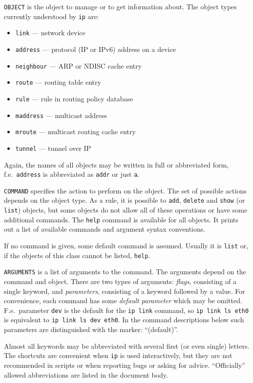 \verb|OBJECT| is the object to manage or to get information about.
The object types currently understood by \verb|ip| are:

\begin{itemize}
\item \verb|link| --- network device
\item \verb|address| --- protocol (IP or IPv6) address on a device
\item \verb|neighbour| --- ARP or NDISC cache entry
\item \verb|route| --- routing table entry
\item \verb|rule| --- rule in routing policy database
\item \verb|maddress| --- multicast address
\item \verb|mroute| --- multicast routing cache entry
\item \verb|tunnel| --- tunnel over IP
\end{itemize}

Again, the names of all objects may be written in full or
abbreviated form, f.e.\ \verb|address| is abbreviated as \verb|addr|
or just \verb|a|.

\verb|COMMAND| specifies the action to perform on the object.
The set of possible actions depends on the object type.
As a rule, it is possible to \verb|add|, \verb|delete| and
\verb|show| (or \verb|list|) objects, but some objects
do not allow all of these operations or have some additional commands.
The \verb|help| command is available for all objects. It prints
out a list of available commands and argument syntax conventions.

If no command is given, some default command is assumed.
Usually it is \verb|list| or, if the objects of this class
cannot be listed, \verb|help|.

\verb|ARGUMENTS| is a list of arguments to the command.
The arguments depend on the command and object. There are two types of arguments:
{\em flags\/}, consisting of a single keyword, and {\em parameters\/},
consisting of a keyword followed by a value. For convenience,
each command has some {\em default parameter\/}
which may be omitted. F.e.\ parameter \verb|dev| is the default
for the {\tt ip link} command, so {\tt ip link ls eth0} is equivalent
to {\tt ip link ls dev eth0}.
In the command descriptions below such parameters
are distinguished with the marker: ``(default)''.

Almost all keywords may be abbreviated with several first (or even single)
letters. The shortcuts are convenient when \verb|ip| is used interactively,
but they are not recommended in scripts or when reporting bugs
or asking for advice. ``Officially'' allowed abbreviations are listed
in the document body.




